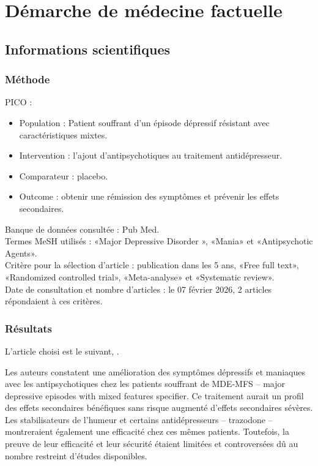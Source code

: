 \section{Démarche de médecine factuelle}

\subsection{Informations scientifiques}
  
\subsubsection{Méthode}

PICO :
\begin{itemize}[label=\textbullet]
    \item Population : Patient souffrant d’un épisode dépressif résistant avec caractéristiques mixtes. 
    \item Intervention : l’ajout d’antipsychotiques au traitement antidépresseur. 
    \item Comparateur : placebo. 
    \item Outcome : obtenir une rémission des symptômes et prévenir les effets secondaires. 
\end{itemize}

Banque de données consultée : Pub Med.\\ 
Termes MeSH utilisés : «Major Depressive Disorder », «Mania» et «Antipsychotic Agents».\\
Critère pour la sélection d’article : publication dans les 5 ans, «Free full text», «Randomized controlled trial», «Meta-analyse» et «Systematic review».\\
Date de consultation et nombre d’articles : le 07 février 2026, 2 articles répondaient à ces critères. 

\subsubsection{Résultats}  

L'article choisi est le suivant, \textcite{gao2025efficacy}.
 
Les auteurs constatent une amélioration des symptômes dépressifs et maniaques avec les antipsychotiques chez les patients souffrant de MDE-MFS -- major depressive episodes with mixed features specifier. Ce traitement aurait un profil des effets secondaires bénéfiques sans risque augmenté d’effets secondaires sévères. Les stabilisateurs de l’humeur et certains antidépresseurs -- trazodone -- montreraient également une efficacité chez ces mêmes patients. Toutefois, la preuve de leur efficacité et leur sécurité étaient limitées et controversées dû au nombre restreint d’études disponibles.

